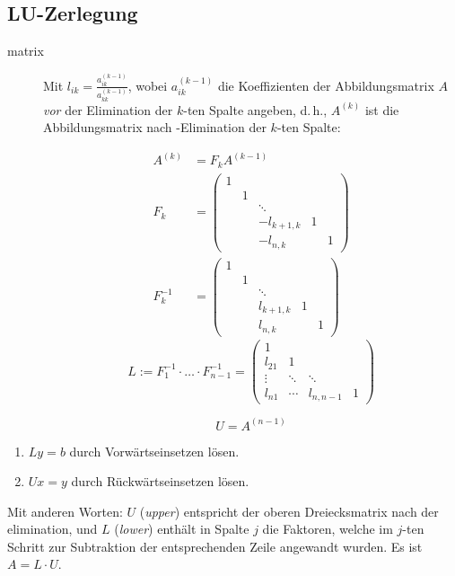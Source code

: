 \subsection{LU-Zerlegung}
\begin{description}
  \item [{matrix}] 
	Mit $l_{ik} = \frac{a_{ik}^{(k-1)}}{a_{kk}^{(k-1)}}$, wobei $a_{ik}^{(k-1)}$ die Koeffizienten der Abbildungsmatrix $A$ \emph{vor} der Elimination der $k$-ten Spalte angeben, d.\,h., $A^{(k)}$ ist die Abbildungsmatrix nach -Elimination der $k$-ten Spalte:

	\begin{align*}
	  A^{(k)} & = F_k A^{(k-1)}\\
	  F_k     & =
	  \begin{pmatrix}
	  1\\
	    & 1\\
	    &   & \ddots\\
	    &   & -l_{k+1,k} & 1\\
	    &   & -l_{n,k}   &   & 1
	  \end{pmatrix}\\
	  F_k^{-1} & =
	  \begin{pmatrix}
	  1\\
	    & 1\\
	    &   & \ddots\\
	    &   & l_{k+1,k} & 1\\
	    &   & l_{n,k}   &   & 1
	  \end{pmatrix}
	\end{align*}
	\[
	  L := F_1^{-1} \cdot \ldots \cdot F_{n-1}^{-1} =
	  \begin{pmatrix}
	    1\\
	    l_{21} & 1\\
	    \vdots & \ddots & \ddots\\
	    l_{n1} & \cdots & l_{n,n-1} & 1
	  \end{pmatrix}
	\]

	\[ U = A^{(n-1)} \]
\end{description}
\begin{enumerate}
  \item $Ly=b$ durch Vorwärtseinsetzen lösen.
  \item $Ux=y$ durch Rückwärtseinsetzen lösen.
\end{enumerate}
Mit anderen Worten: $U$ (\mbox{\emph{upper}}) entspricht der oberen Dreiecksmatrix nach der \-elimination, und $L$ (\mbox{\emph{lower}}) enthält in Spalte $j$ die Faktoren, welche im $j$-ten Schritt zur Subtraktion der entsprechenden Zeile angewandt wurden.
Es ist $A=L\cdot U$.


